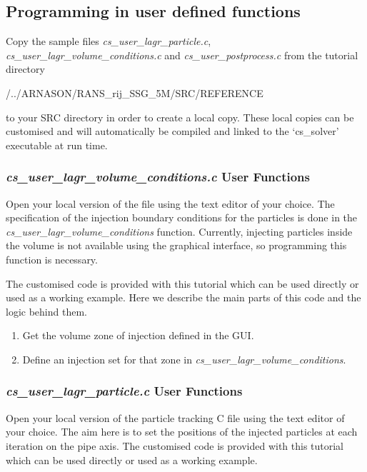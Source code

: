 \subsection{Programming in user defined functions}\label{lag:user_coding}

Copy the sample files \textit{cs\_user\_lagr\_particle.c}, \textit{cs\_user\_lagr\_volume\_conditions.c} and \textit{cs\_user\_postprocess.c} from the tutorial directory

/../ARNASON/RANS\_rij\_SSG\_5M/SRC/REFERENCE

 to your SRC directory in order to create a local copy.  These local copies can be customised and will automatically be compiled and linked to the ‘cs\_solver’ executable at run time.

\subsubsection{\textit{cs\_user\_lagr\_volume\_conditions.c} User Functions}\label{lag:cs_user_lagr_volume_conditions.c}

Open your local version of the file using the text editor of your choice.  The specification of the injection boundary conditions for the particles is done in the \textit{cs\_user\_lagr\_volume\_conditions} function. Currently, injecting particles inside the volume is not available using the graphical interface, so programming this function is necessary.

The customised code is provided with this tutorial which can be used directly or used as a working example.  Here we describe the main parts of this code and the logic behind them.

\begin{enumerate}
\item Get the volume zone of injection defined in the GUI.
\item Define an injection set for that zone in \textit{cs\_user\_lagr\_volume\_conditions}.
\end{enumerate}

\subsubsection{\textit{cs\_user\_lagr\_particle.c} User Functions}\label{lag:cs_user_lagr_particle.c}

Open your local version of the particle tracking C file using the text editor of your choice. The aim here is to set the positions of the injected particles at each iteration on the pipe axis. The customised code is provided with this tutorial which can be used directly or used as a working example.

